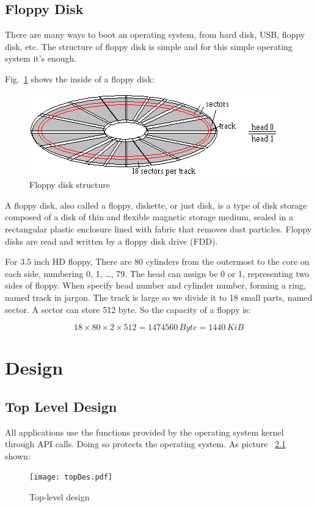 \documentclass{swfcthesis}
\begin{document}
\section{Floppy Disk}

There are many ways to boot an operating system, from hard disk, USB, floppy disk, etc.
The structure of floppy disk is simple and for this simple operating system it's enough.

Fig.~\ref{fig:flpy1.png} shows the inside of a floppy disk:
\begin{figure}[!ht]
  \centering
  \includegraphics[width=.5\textwidth]{../figs/bootLoader/flpy1.png}
  \caption{Floppy disk structure}
  \label{fig:flpy1.png}
\end{figure}

A floppy disk, also called a floppy, diskette, or just disk, is a type of disk storage
composed of a disk of thin and flexible magnetic storage medium, sealed in a rectangular
plastic enclosure lined with fabric that removes dust particles. Floppy disks are read and
written by a floppy disk drive (FDD)\cite{wiki:floppy}.

For 3.5 inch HD floppy,  There are 80 cylinders from the outermost to
the core on each side, numbering 0, 1, \ldots, 79. The head can assign be 0 or 1,
representing two sides of floppy. When specify head number and cylinder number, forming a
ring, named track in jargon. The track is large so we divide it to 18 small parts, named
sector. A sector can store 512 byte. So the capacity of a floppy is:

\[18 \times 80 \times 2 \times 512 = 1474560\,Byte = 1440\,KiB\]


\chapter{Design}

\section{Top Level Design}
All applications use the functions provided by the operating system kernel through API
calls. Doing so protects the operating system. As picture ~\ref{fig:top-level} shown:
\begin{figure}[!htbp]
  \centering
  \texttt{[image: topDes.pdf]}
  \caption{Top-level design}
  \label{fig:top-level}
\end{figure}
\end{document}
